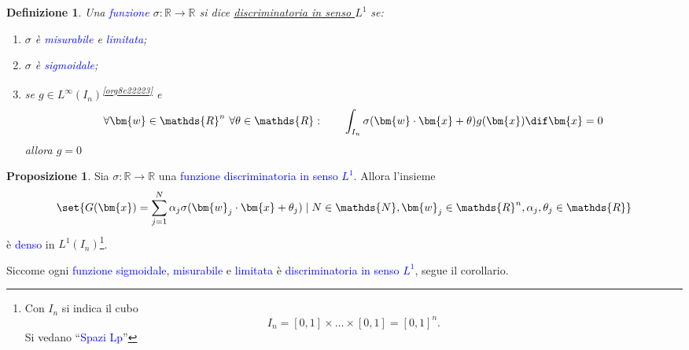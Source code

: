 \documentclass[10pt]{book}
\newcommand{\1}{\mathds{1}}
\newcommand{\R}{\mathds{R}}
\newcommand{\N}{\mathds{N}}
\theoremstyle{definition}%
\newtheorem{prop}[thm]{Proposizione}
\theoremstyle{plain}
\newtheorem{definizione}[thm]{Definizione}
\theoremstyle{remark}
\renewcommand{\href}[2]{\textcolor{blue}{#2}}
\begin{document}
\begin{definizione}
Una \href{../../../../../org/roam/20250202170607-classe_relazione_binaria.org}{funzione} \(\sigma:\R\to \R\) si dice \uline{discriminatoria in senso \(L^{1}\)} se:
\begin{enumerate}
\item \(\sigma\) è \href{../../../../../org/roam/20250704104947-funzione_misurabile.org}{misurabile} e \href{../../../../../org/roam/20250704145518-funzione_limitata.org}{limitata};
\item \(\sigma\) è \href{../../../../../org/roam/20250625110110-funzione_sigmoidale.org}{sigmoidale};
\item se \(g \in L^{\infty}(I_{n})\)\textsuperscript{\ref{org8c22223}} e
\begin{equation*}
 \forall \bm{w} \in \R^{n}\ \forall \theta \in \R:\qquad\int_{I_{n}} \sigma(\bm{w}\cdot\bm{x} + \theta)g(\bm{x})\dif\bm{x} = 0
\end{equation*}
allora \(g=0\)
\end{enumerate}
\label{def9.3.16}
\end{definizione}

\begin{prop}
Sia \(\sigma:\R\to\R\) una \href{../../../../../org/roam/20250202170607-classe_relazione_binaria.org}{funzione} \href{../../../../../org/roam/20250625105528-funzione_discriminatoria_per_una_misura_di_baire_sul_cubo_unitario.org}{discriminatoria in senso \(L^{1}\)}. Allora l'insieme
\begin{equation*}
\set{
G(\bm{x}) = \sum_{j=1}^{N}\alpha_{j}\sigma(\bm{w}_{j}\cdot \bm{x} + \theta_{j})\mid N \in \N, \bm{w}_{j} \in \R^{n}, \alpha_{j},\theta_{j} \in \R
}
\end{equation*}
è \href{../../../../../org/roam/20250301193045-sottoinsieme_denso.org}{denso} in \(L^{1}(I_{n})\)\footnote{Con \(I_{n}\) si indica il cubo
\begin{equation*}
I_{n} = [0,1]\times \dots \times [0,1] = [0,1]^{n}.
\end{equation*}
Si vedano ``\href{../../../../../org/roam/20250624162220-spazi_lp.org}{Spazi Lp}''\label{org3474d49}}.
\label{prop9.3.17}
\end{prop}

Siccome ogni \href{../../../../../org/roam/20250202170607-classe_relazione_binaria.org}{funzione} \href{../../../../../org/roam/20250625110110-funzione_sigmoidale.org}{sigmoidale}, \href{../../../../../org/roam/20250704104947-funzione_misurabile.org}{misurabile} e \href{../../../../../org/roam/20250704145518-funzione_limitata.org}{limitata} è \href{../../../../../org/roam/20250625105528-funzione_discriminatoria_per_una_misura_di_baire_sul_cubo_unitario.org}{discriminatoria in senso \(L^{1}\)}, segue il corollario.
\end{document}
